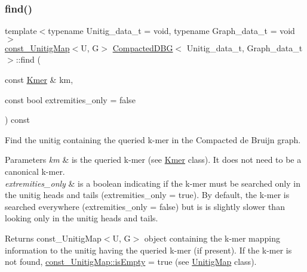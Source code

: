 \subsubsection{\texorpdfstring{find()}{find()}\hspace{0.1cm}{\footnotesize\ttfamily [2/2]}}
{\footnotesize\ttfamily template$<$typename Unitig\+\_\+data\+\_\+t = void, typename Graph\+\_\+data\+\_\+t = void$>$ \\
\hyperlink{CompactedDBG_8hpp_a631369597e56604279ba89a211c14fd0}{const\+\_\+\+Unitig\+Map}$<$U, G$>$ \hyperlink{classCompactedDBG}{Compacted\+D\+BG}$<$ Unitig\+\_\+data\+\_\+t, Graph\+\_\+data\+\_\+t $>$\+::find (\begin{DoxyParamCaption}\item[{const \hyperlink{classKmer}{Kmer} \&}]{km,  }\item[{const bool}]{extremities\+\_\+only = {\ttfamily false} }\end{DoxyParamCaption}) const}



Find the unitig containing the queried k-\/mer in the Compacted de Bruijn graph. 


\begin{DoxyParams}{Parameters}
{\em km} & is the queried k-\/mer (see \hyperlink{classKmer}{Kmer} class). It does not need to be a canonical k-\/mer. \\
\hline
{\em extremities\+\_\+only} & is a boolean indicating if the k-\/mer must be searched only in the unitig heads and tails (extremities\+\_\+only = true). By default, the k-\/mer is searched everywhere (extremities\+\_\+only = false) but is is slightly slower than looking only in the unitig heads and tails. \\
\hline
\end{DoxyParams}
\begin{DoxyReturn}{Returns}
const\+\_\+\+Unitig\+Map$<$\+U, G$>$ object containing the k-\/mer mapping information to the unitig having the queried k-\/mer (if present). If the k-\/mer is not found, \hyperlink{structUnitigMapBase_ade629940b2611494dbf233cb1144da80}{const\+\_\+\+Unitig\+Map\+::is\+Empty} = true (see \hyperlink{classUnitigMap}{Unitig\+Map} class). 
\end{DoxyReturn}
\mbox{\label{classCompactedDBG_ac28279d78c552001464ac76587359445}} 
